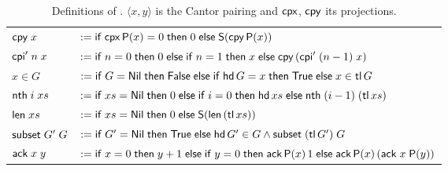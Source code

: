 \begin{table}[p]
\begin{tabular}{@{}ll@{}}
$\fn{cpy}\;x$ & $:= \ite{\fn{cpx}\,\Pre{x} = 0}{0}{\Suc{\fn{cpy}\,\Pre{x}}}$\\
$\fn{cpi}'\;n\;x$ & $:= \ite{n = 0}{0}{\ite{n = 1}{x}{\fn{cpy}\,(\fn{cpi}'\;(n-1)\;x)}}$\\
$x \in G$ & $:= \ite{G = \fn{Nil}}{\fn{False}}
                {\ite{\fn{hd}\,G = x}{\fn{True}}{x \in \fn{tl}\,G}}$\\
$\fn{nth}\;i\;xs$ & $:= \ite{xs = \fn{Nil}}{0}
                {\ite{i = 0}{\fn{hd}\,xs}{\fn{nth}\;(i-1)\;(\fn{tl}\,xs)}}$\\
$\fn{len}\;xs$ & $:= \ite{xs = \fn{Nil}}{0}{\Suc{\fn{len}\,(\fn{tl}\,xs)}}$\\
$\fn{subset}\;G'\;G$ & $:= \ite{G' = \fn{Nil}}{\fn{True}}
                {\fn{hd}\,G' \in G \wedge \fn{subset}\;(\fn{tl}\,G')\;G}$\\
$\fn{ack}\;x\;y$ & $:= \ite{x = 0}{y + 1}{\ite{y = 0}{\fn{ack}\,\Pre{x}\,1}
                {\fn{ack}\,\Pre{x}\,(\fn{ack}\;x\;\Pre{y})}}$\\
\bottomrule
\end{tabular}
\caption{Definitions of \QGA.  $\langle x, y\rangle$ is the Cantor pairing and
$\fn{cpx}$, $\fn{cpy}$ its projections.}
\label{tab:qga-defs}
\end{table}

